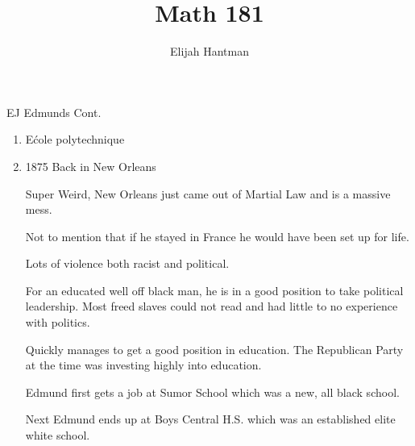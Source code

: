 \documentclass{report}
\title{\Huge{Math 181}}
\author{\huge{Elijah Hantman}}
\date{}
\begin{document}
\maketitle
\newpage

\begin{description}
    \item {\large EJ Edmunds Cont.}  
        \begin{mdframed}
            \begin{enumerate}
                \item E\'cole polytechnique
                \item 1875 Back in New Orleans
                    \begin{center}
                    \end{center}
                    \begin{mdframed}
                        Super Weird, New Orleans just
                        came out of Martial Law and is
                        a massive mess.

                        Not to mention that if he stayed in
                        France he would have been set up for
                        life.

                        Lots of violence both racist and
                        political.

                        For an educated well off black man,
                        he is in a good position to take
                        political leadership. Most freed
                        slaves could not read and had little
                        to no experience with politics.

                        Quickly manages to get a good position
                        in education. The Republican Party
                        at the time was investing highly into
                        education.
                    \end{mdframed}
                    \begin{mdframed}
                        Edmund first gets a job at
                        Sumor School which was a new,
                        all black school.
                    \end{mdframed}
                    \begin{mdframed}
                        Next Edmund ends up at Boys Central
                        H.S. which was an established
                        elite white school.


\end{mdframed}
\end{enumerate}
\end{mdframed}
\end{description}
\end{document}
